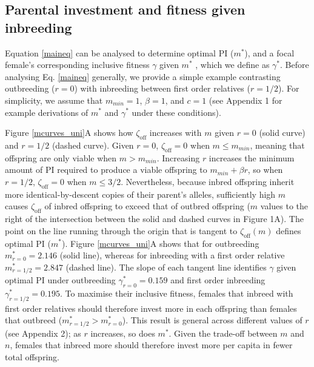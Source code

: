 \documentclass[10pt,letterpaper]{article}
\begin{document}
\subsection*{Parental investment and fitness given inbreeding}

Equation \ref{maineq} can be analysed to determine optimal PI ($m^{*}$), and a focal female's corresponding inclusive fitness $\gamma$ given $m^{*}$ \cite[][]{Kuijper2012}, which we define as $\gamma^{*}$. Before analysing Eq. \ref{maineq} generally, we provide a simple example contrasting outbreeding ($r=0$) with inbreeding between first order relatives ($r=1/2$). For simplicity, we assume that $m_{min}=1$, $\beta=1$, and $c=1$ (see Appendix 1 for example derivations of $m^{*}$ and $\gamma^{*}$ under these conditions).

Figure \ref{mcurves_uni}A shows how $\zeta_{\textrm{off}}$ increases with $m$ given $r=0$ (solid curve) and $r=1/2$ (dashed curve). Given $r=0$, $\zeta_{\textrm{off}}=0$ when $m \leq m_{min}$, meaning that offspring are only viable when $m>m_{min}$. Increasing $r$ increases the minimum amount of PI required to produce a viable offspring to $m_{min}+\beta r$, so when $r=1/2$, $\zeta_{\textrm{off}}=0$ when $m \leq 3/2$. Nevertheless, because inbred offspring inherit more identical-by-descent copies of their parent's alleles, sufficiently high $m$ causes $\zeta_{\textrm{off}}$ of inbred offspring to exceed that of outbred offspring ($m$ values to the right of the intersection between the solid and dashed curves in Figure 1A). The point on the line running through the origin that is tangent to $\zeta_{\textrm{off}}(m)$ defines optimal PI ($m^{*}$). Figure \ref{mcurves_uni}A shows that for outbreeding $m^{*}_{r=0}=2.146$ (solid line), whereas for inbreeding with a first order relative $m^{*}_{r=1/2}=2.847$ (dashed line). The slope of each tangent line identifies $\gamma$ given optimal PI under outbreeding $\gamma^{*}_{r=0}=0.159$ and first order inbreeding $\gamma^{*}_{r=1/2}=0.195$. To maximise their inclusive fitness, females that inbreed with first order relatives should therefore invest more in each offspring than females that outbreed ($m^{*}_{r=1/2}>m^{*}_{r=0}$). This result is general across different values of $r$ (see Appendix 2); as $r$ increases, so does $m^{*}$. Given the trade-off between $m$ and $n$, females that inbreed more should therefore invest more per capita in fewer total offspring. 
\end{document}
